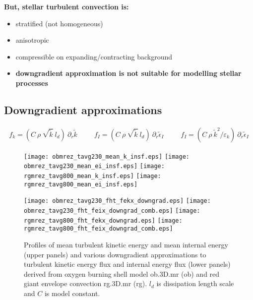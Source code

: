 \documentclass[10pt,paper=a4]{report}
\newcommand{\fht}{\widetilde}
\begin{document}
\begin{itemize}
{\bf But, stellar turbulent convection is:}
\begin{itemize}
\item stratified (not homogeneous)
\item anisotropic
\item compressible on expanding/contracting background
\end{itemize}

\begin{itemize}
\item {\bf {\LARGE downgradient approximation is not suitable for modelling stellar processes}}
\end{itemize}

\end{itemize}


\newpage

\subsection{Downgradient approximations}

\begin{align}
f_k = (C \ \rho \ \sqrt{\fht{k}} \ l_d) \ \partial_r \fht{k} \ \ \ \ \ \ \ \ \ \ \ f_I = (C \ \rho \ \sqrt{\fht{k}} \ l_d) \ \partial_r \fht{\epsilon}_I \ \ \ \ \ \ \ \ \ \ \ f_I = (C \ \rho \ \fht{k}^2 / \varepsilon_k) \ \partial_r \fht{\epsilon}_I
\end{align}

\begin{figure}[!h]
\centerline{
\texttt{[image: obmrez\_tavg230\_mean\_k\_insf.eps]}
\texttt{[image: obmrez\_tavg230\_mean\_ei\_insf.eps]}
\texttt{[image: rgmrez\_tavg800\_mean\_k\_insf.eps]}
\texttt{[image: rgmrez\_tavg800\_mean\_ei\_insf.eps]}}

\centerline{
\texttt{[image: obmrez\_tavg230\_fht\_fekx\_downgrad.eps]}
\texttt{[image: obmrez\_tavg230\_fht\_feix\_downgrad\_comb.eps]}
\texttt{[image: rgmrez\_tavg800\_fht\_fekx\_downgrad.eps]}
\texttt{[image: rgmrez\_tavg800\_fht\_feix\_downgrad\_comb.eps]}}
\caption{Profiles of mean turbulent kinetic energy and mean internal energy (upper panels) and various downgradient approximations to turbulent kinetic energy flux and internal energy flux (lower panels) derived from oxygen burning shell model {\sf ob.3D.mr} (ob) and red giant envelope convection {\sf rg.3D.mr} (rg). $l_d$ is dissipation length scale and $C$ is model constant. \label{fig:downgrad_approx}}
\end{figure}
\end{document}
